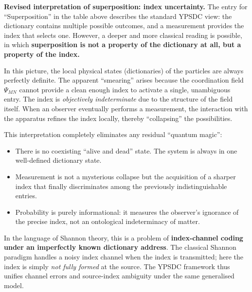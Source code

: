 \documentclass[12pt,a4paper]{article}
\theoremstyle{remark}
\begin{document}
	
	\noindent
	\textbf{Revised interpretation of superposition: index uncertainty.}
	The entry for ``Superposition'' in the table above describes the
	standard YPSDC view: the dictionary contains multiple possible
	outcomes, and a measurement provides the index that selects one.
	However, a deeper and more classical reading is possible, in which
	\textbf{superposition is not a property of the dictionary at all, but
		a property of the index.}
	
	In this picture, the local physical states (dictionaries) of the
	particles are always perfectly definite.  The apparent ``smearing''
	arises because the coordination field \(\Psi_{MN}\) cannot provide a
	clean enough index to activate a single, unambiguous entry.  The
	index is \emph{objectively indeterminate} due to the structure of the
	field itself.  When an observer eventually performs a measurement,
	the interaction with the apparatus refines the index locally, thereby
	``collapsing'' the possibilities.
	
	This interpretation completely eliminates any residual ``quantum
	magic'':
	\begin{itemize}[leftmargin=*]
		\item There is no coexisting ``alive and dead'' state.  The
		system is always in one well-defined dictionary state.
		\item Measurement is not a mysterious collapse but the
		acquisition of a sharper index that finally discriminates
		among the previously indistinguishable entries.
		\item Probability is purely informational: it measures the
		observer's ignorance of the precise index, not an
		ontological indeterminacy of matter.
	\end{itemize}
	
	In the language of Shannon theory, this is a problem of
	\textbf{index-channel coding under an imperfectly known
		dictionary address}.  The classical Shannon paradigm handles a
	noisy index channel when the index is transmitted; here the index
	is simply \emph{not fully formed} at the source.  The YPSDC
	framework thus unifies channel errors and source-index ambiguity
	under the same generalised model.
	
	\medskip
	
\end{document}
